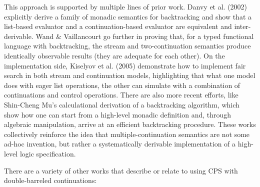 \documentclass[screen,anonymous,review,draft,natbib=false]{acmart} %
\begin{document}
This approach is supported by multiple lines of prior work. Danvy et al. (2002) explicitly derive a family of monadic semantics for backtracking and show that a list-based evaluator and a continuation-based evaluator are equivalent and inter-derivable. Wand \& Vaillancourt go further in proving that, for a typed functional language with backtracking, the stream and two-continuation semantics produce identically observable results (they are adequate for each other). On the implementation side, Kiselyov et al. (2005) demonstrate how to implement fair search in both stream and continuation models, highlighting that what one model does with eager list operations, the other can simulate with a combination of continuations and control operations. There are also more recent efforts, like Shin-Cheng Mu’s calculational derivation of a backtracking algorithm, which show how one can start from a high-level monadic definition and, through algebraic manipulation, arrive at an efficient backtracking procedure. These works collectively reinforce the idea that multiple-continuation semantics are not some ad-hoc invention, but rather a systematically derivable implementation of a high-level logic specification.

There are a variety of other works that describe or relate to using CPS with double-barreled continuations:





\end{document}
